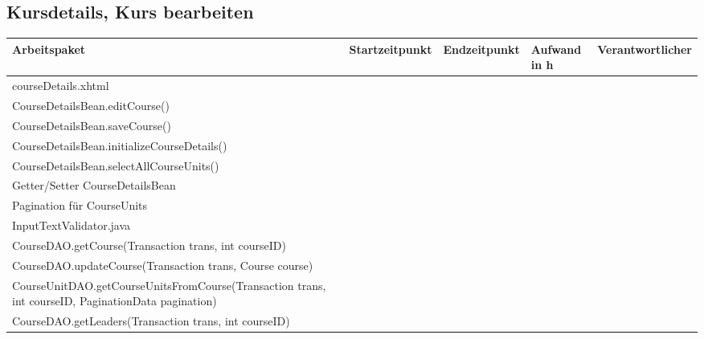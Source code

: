 \begin{landscape}
	\subsection{Kursdetails, Kurs bearbeiten}
	\begin{tabular}{|p{10cm}|p{4cm}|p{3cm}|p{3cm}|p{3cm}|}
		\hline  \textbf{Arbeitspaket} & \textbf{Startzeitpunkt} & \textbf{Endzeitpunkt} & \textbf{Aufwand in h} & \textbf{Verantwortlicher} \\ 
		\hline   courseDetails.xhtml                                         &                            &                             &                     &\\
		\hline   CourseDetailsBean.editCourse()                              &                            &                             &                     &\\
		\hline   CourseDetailsBean.saveCourse()                              &                            &                             &                     &\\
		\hline   CourseDetailsBean.initializeCourseDetails()                 &                            &                             &                     &\\
		\hline   CourseDetailsBean.selectAllCourseUnits()                    &                            &                             &                     &\\
		\hline   Getter/Setter CourseDetailsBean                             &                            &                             &                     &\\
		\hline   Pagination für CourseUnits                                  &                            &                             &                     &\\
		\hline   InputTextValidator.java                                     &                            &                             &                     &\\ 
		\hline   CourseDAO.getCourse(Transaction trans, int courseID)        &                            &                             &                     &\\ 
		\hline   CourseDAO.updateCourse(Transaction trans, Course course)    &                            &                             &                     &\\
		\hline   CourseUnitDAO.getCourseUnitsFromCourse(Transaction trans, int courseID, PaginationData pagination) &                            &                             &                     &\\
		\hline   CourseDAO.getLeaders(Transaction trans, int courseID)    &                            &                             &                     &\\
		\hline 
	\end{tabular} \ \\
	\ \\
	

\end{landscape}
